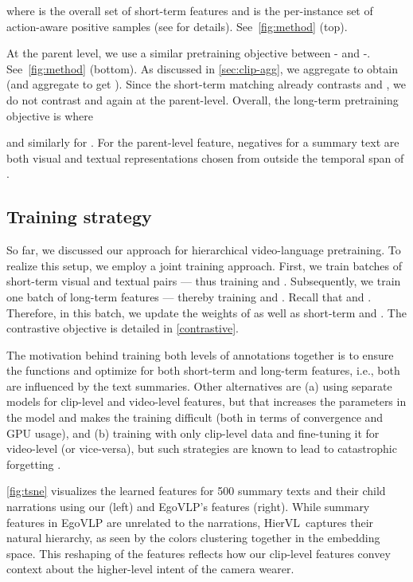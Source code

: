 \documentclass[10pt,twocolumn,letterpaper]{article}
\newcommand{\ccCR}[1]{{\color{black}{}#1}}
\newcommand{\modelname}[0]{{HierVL}}
\begin{document}
where  is the overall set of short-term features and  is the per-instance set of action-aware positive samples (see \cite{egovlp} for details).  See~\cref{fig:method} (top). 

At the parent level, we use a similar pretraining objective between - and -. See~\cref{fig:method} (bottom).  As discussed in \cref{sec:clip-agg}, we aggregate  to obtain  (and aggregate  to get ). Since the short-term matching already contrasts  and , we do not contrast  and  again at the parent-level. 
Overall, the long-term pretraining objective is  where 

and similarly for . For the parent-level feature, negatives for a summary text  are both visual and textual representations chosen from outside the temporal span of .






\subsection{Training strategy} 
\label{pre-train-strategy}


So far, we discussed our approach for hierarchical video-language pretraining. To realize this setup, we employ a joint training approach. First, we train  batches of short-term visual and textual pairs  --- thus training  and . Subsequently, we train one batch of long-term features --- thereby training  and . Recall that  and . Therefore, in this batch, we update the weights of  as well as short-term  and . \ccCR{The contrastive objective is detailed in \cref{contrastive}.}

The motivation behind training both levels of annotations together is to ensure the functions  and  optimize for both short-term and long-term features, i.e., both are influenced by the text summaries. Other alternatives are (a) using separate models for clip-level and video-level features, but that increases the parameters in the model and makes the training difficult (both in terms of convergence and GPU usage), and (b) training with only clip-level data and fine-tuning it for video-level (or vice-versa), but such strategies are known to
lead to catastrophic forgetting \cite{catastrophic-forgetting-1,catastrophic-forgetting-2,catastrophic-forgetting-3}.  


\cref{fig:tsne} visualizes the learned features for 500 summary texts and their child narrations using our  (left) and EgoVLP's features (right).  
While summary features in EgoVLP are unrelated to the  narrations, 
\modelname~captures their natural hierarchy, as seen by the colors clustering together in the embedding space. 
This reshaping of the features reflects how our clip-level features convey context about the higher-level intent of the camera wearer.
\end{document}
